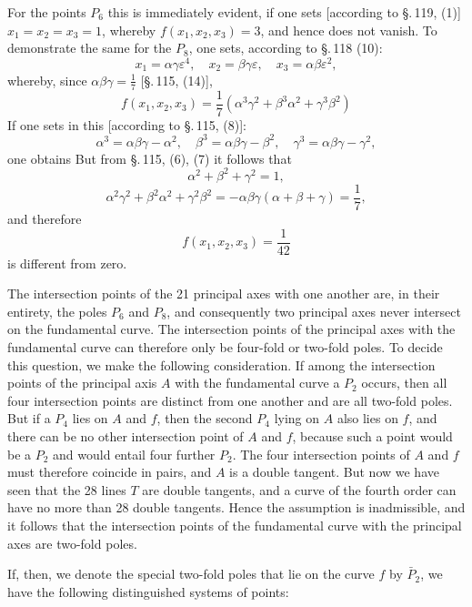 For the points $P_6$ this is immediately evident, if one sets
[according to \S.\,119, (1)] $x_1 = x_2 = x_3 = 1$, whereby
$f(x_1, x_2, x_3) = 3$, and hence does not vanish. To demonstrate the same for
the $P_8$, one sets, according to \S.\,118 (10):
\[
x_1 = \alpha\gamma\varepsilon^4, \quad x_2 = \beta\gamma\varepsilon,
\quad x_3 = \alpha\beta\varepsilon^2,
\]
whereby, since $\alpha\beta\gamma = \frac{1}{7}$ [\S.\,115, (14)],
\[
f(x_1, x_2, x_3) = \frac{1}{7}(\alpha^3\gamma^2 + \beta^3\alpha^2 + \gamma^3\beta^2)
\]
If one sets in this [according to \S.\,115, (8)]:
\[
\alpha^3 = \alpha\beta\gamma - \alpha^2, \quad \beta^3 = \alpha\beta\gamma - \beta^2,
\quad \gamma^3 = \alpha\beta\gamma - \gamma^2,
\]
one obtains
But from \S.\,115, (6), (7) it follows that
\[
\alpha^2 + \beta^2 + \gamma^2 = 1,
\]
\[
\alpha^2\gamma^2 + \beta^2\alpha^2 + \gamma^2\beta^2 = -\alpha\beta\gamma(\alpha+\beta+\gamma) = \frac{1}{7},
\]
and therefore
\[
f(x_1, x_2, x_3) = \frac{1}{42}
\]
is different from zero.

The intersection points of the 21 principal axes with one another are, in their entirety,
the poles $P_6$ and $P_8$, and consequently two principal axes never
intersect on the fundamental curve. The intersection points of the principal axes with the
fundamental curve can therefore only be four-fold or two-fold poles. To
decide this question, we make the following consideration. If among
the intersection points of the principal axis $A$ with the fundamental curve a $P_2$
occurs, then all four intersection points are distinct from one another and
are all two-fold poles. But if a $P_4$ lies on $A$ and $f$,
then the second $P_4$ lying on $A$ also lies on $f$, and there can be
no other intersection point of $A$ and $f$, because such a point would be
a $P_2$ and would entail four further $P_2$. The four
intersection points of $A$ and $f$ must therefore coincide in pairs, and
$A$ is a double tangent. But now we have seen that the 28
lines $T$ are double tangents, and a curve of the fourth order can
have no more than 28 double tangents. Hence the assumption is
inadmissible, and it follows that the intersection points of the fundamental curve with
the principal axes are two-fold poles.

If, then, we denote the special two-fold poles that lie on the
curve $f$ by $\bar P_2$, we have the following distinguished
systems of points:
